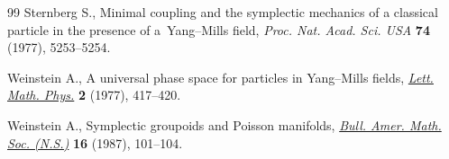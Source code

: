 \documentclass[pdftex]{sigma}
\numberwithin{equation}{section}
\begin{document}
\begin{thebibliography}{99}
Sternberg S., Minimal coupling and the symplectic mechanics of a classical
 particle in the presence of a~{Y}ang--{M}ills f\/ield, \textit{Proc. Nat. Acad.
 Sci. USA} \textbf{74} (1977), 5253--5254.

Weinstein A., A universal phase space for particles in {Y}ang--{M}ills f\/ields,
 \href{https://doi.org/10.1007/BF00400169}{\textit{Lett. Math. Phys.}} \textbf{2} (1977), 417--420.

Weinstein A., Symplectic groupoids and {P}oisson manifolds, \href{https://doi.org/10.1090/S0273-0979-1987-15473-5}{\textit{Bull. Amer.
 Math. Soc. (N.S.)}} \textbf{16} (1987), 101--104.

\end{thebibliography}\LastPageEnding
\end{document}
